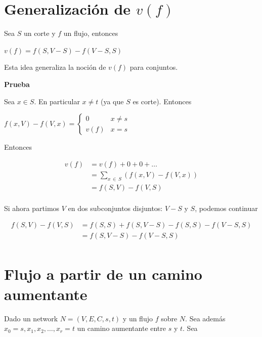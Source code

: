 \documentclass[10pt,a4paper]{article}
\begin{document}
\section*{Generalización de $v(f)$}

Sea $S$ un corte y $f$ un flujo, entonces

\begin{center}
$v(f) = f(S, V- S) - f(V-S, S)$
\end{center}

Esta idea generaliza la noción de $v(f)$ para conjuntos.

\textbf{Prueba}

Sea $x \in S$. En particular $x\neq t$ (ya que $S$ es corte). Entonces

\begin{center}
$f(x, V) - f(V, x) = \begin{cases} 0 & x\neq s\\ v(f) &x=s \end{cases}$
\end{center}

Entonces

\begin{center}
\begin{align*} v(f) &= v(f) + 0 + 0 + \dots\\ &= \sum\limits_{x\,\in\, S} \left(f(x, V) - f(V, x)\right)\\ &= f(S, V) - f(V, S)\\ \end{align*}
\end{center}

Si ahora partimos $V$ en dos subconjuntos disjuntos: $V - S$ y $S$, podemos continuar

\begin{center}
\begin{align*} f(S, V) - f(V, S) &= f(S, S) + f(S, V-S) - f(S, S) - f(V-S, S)\\ &= f(S, V-S) - f(V-S, S)\\ \end{align*}
\end{center}

\section*{Flujo a partir de un camino aumentante}

Dado un network $N = (V, E, C, s, t)$ y un flujo $f$ sobre $N$. Sea además $x_0 = s, x_1, x_2,\dots, x_r=t$ un camino aumentante entre $s$ y $t$. Sea
\end{document}
